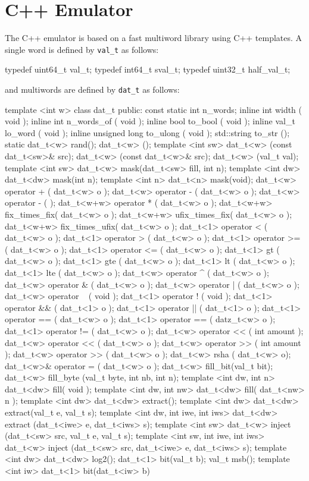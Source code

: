 \documentclass[10pt,twocolumn]{article}
\def\code#1{{\small\tt #1}}
\begin{document}
\section{C++ Emulator}

The C++ emulator is based on a fast multiword library using
C++ templates.  
A single word is defined by \code{val\_t} as follows: 

\begin{cpp}
typedef uint64_t val_t;
typedef int64_t sval_t; 
typedef uint32_t half_val_t;
\end{cpp}

\noindent
and multiwords are defined by \code{dat\_t} as follows:

\begin{cpp}
template <int w>
class dat_t {
 public:
  const static int n_words;
  inline int width ( void );
  inline int n_words_of ( void );
  inline bool to_bool ( void );
  inline val_t lo_word ( void );
  inline unsigned long to_ulong ( void );
  std::string to_str ();
  static dat_t<w> rand();
  dat_t<w> ();
template <int sw> 
  dat_t<w> (const dat_t<sw>& src);
  dat_t<w> (const dat_t<w>& src);
  dat_t<w> (val_t val);
template <int sw> 
  dat_t<w> mask(dat_t<sw> fill, int n);
template <int dw> 
  dat_t<dw> mask(int n);
template <int n> 
  dat_t<n> mask(void);
  dat_t<w> operator + ( dat_t<w> o );
  dat_t<w> operator - ( dat_t<w> o );
  dat_t<w> operator - ( );
  dat_t<w+w> operator * ( dat_t<w> o );
  dat_t<w+w> fix_times_fix( dat_t<w> o );
  dat_t<w+w> ufix_times_fix( dat_t<w> o );
  dat_t<w+w> fix_times_ufix( dat_t<w> o );
  dat_t<1> operator < ( dat_t<w> o );
  dat_t<1> operator > ( dat_t<w> o );
  dat_t<1> operator >= ( dat_t<w> o );
  dat_t<1> operator <= ( dat_t<w> o );
  dat_t<1> gt ( dat_t<w> o );
  dat_t<1> gte ( dat_t<w> o );
  dat_t<1> lt ( dat_t<w> o );
  dat_t<1> lte ( dat_t<w> o );
  dat_t<w> operator ^ ( dat_t<w> o );
  dat_t<w> operator & ( dat_t<w> o );
  dat_t<w> operator | ( dat_t<w> o );
  dat_t<w> operator ~ ( void );
  dat_t<1> operator ! ( void );
  dat_t<1> operator && ( dat_t<1> o );
  dat_t<1> operator || ( dat_t<1> o );
  dat_t<1> operator == ( dat_t<w> o );
  dat_t<1> operator == ( datz_t<w> o );
  dat_t<1> operator != ( dat_t<w> o );
  dat_t<w> operator << ( int amount );
  dat_t<w> operator << ( dat_t<w> o );
  dat_t<w> operator >> ( int amount );
  dat_t<w> operator >> ( dat_t<w> o );
  dat_t<w> rsha ( dat_t<w> o);
  dat_t<w>& operator = ( dat_t<w> o );
  dat_t<w> fill_bit(val_t bit);
  dat_t<w> fill_byte
    (val_t byte, int nb, int n);
template <int dw, int n> 
  dat_t<dw> fill( void );
template <int dw, int nw> 
  dat_t<dw> fill( dat_t<nw> n );
template <int dw> 
  dat_t<dw> extract();
template <int dw> 
  dat_t<dw> extract(val_t e, val_t s);
template <int dw, int iwe, int iws> 
  dat_t<dw> extract
    (dat_t<iwe> e, dat_t<iws> s);
template <int sw> 
  dat_t<w> inject
    (dat_t<sw> src, val_t e, val_t s);
template <int sw, int iwe, int iws> 
  dat_t<w> inject
    (dat_t<sw> src, 
     dat_t<iwe> e, dat_t<iws> s);
template <int dw> 
  dat_t<dw> log2();
  dat_t<1> bit(val_t b);
  val_t msb();
template <int iw>
  dat_t<1> bit(dat_t<iw> b)
}
\end{cpp}
\end{document}
